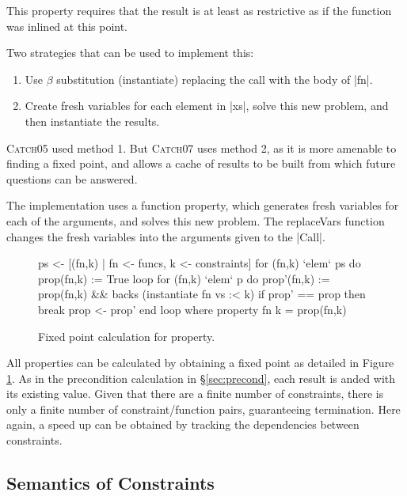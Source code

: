 \documentclass[preprint]{sigplanconf}
\newcommand{\C}[1]{\textsf{#1}}
\newcommand{\catch}{\textsc{Catch}}
\begin{document}
\begin{description}
    This property requires that the result is at least as restrictive as if the function was inlined at this point.

    Two strategies that can be used to implement this:

    \begin{enumerate}
    \item Use $\beta$ substitution (\C{instantiate}) replacing the call with the body of |fn|.
    \item Create fresh variables for each element in |xs|, solve this new problem, and then instantiate the results.
    \end{enumerate}

    \catch05 used method 1. But \catch07 uses method 2, as it is more amenable to finding a fixed point, and allows a cache of results to be built from which future questions can be answered.

    The implementation uses a function \C{property}, which generates fresh variables for each of the arguments, and solves this new problem. The \C{replaceVars} function changes the fresh variables into the arguments given to the |Call|.

    \begin{figure}
    \begin{code}
    ps <- [(fn,k) | fn <- funcs, k <- constraints]
    for (fn,k) `elem` ps do prop(fn,k) := True
    loop
        for (fn,k) `elem` p do
            prop'(fn,k) := prop(fn,k) && backs (instantiate fn vs :< k)
        if prop' == prop then break
        prop <- prop'
    end loop
        where
            property fn k = prop(fn,k)
    \end{code}
    \caption{Fixed point calculation for \C{property}.}
    \label{fig:property_fixp}
    \end{figure}

    All properties can be calculated by obtaining a fixed point as detailed in Figure \ref{fig:property_fixp}. As in the precondition calculation in \S\ref{sec:precond}, each result is anded with its existing value. Given that there are a finite number of constraints, there is only a finite number of constraint/function pairs, guaranteeing termination. Here again, a speed up can be obtained by tracking the dependencies between constraints.
\end{description}

\subsection{Semantics of Constraints}
\end{document}
